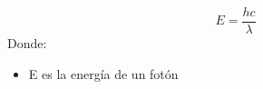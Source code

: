 \documentclass[]{article}
\begin{document}
\begin{equation}
E=\frac{hc}{\lambda}
\end{equation}
Donde:\\

\begin{itemize}
	\item E es la energía de un fotón	
\end{itemize}




%
%
%

	
	
	
	
\end{document}
